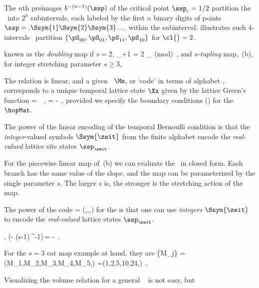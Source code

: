 \begin{description}
{The $n$th
preimages $b^{-(n-1)}(\ssp)$ of the critical point $\ssp_c=1/2$
partition the \statesp\ into $2^n$ subintervals, each labeled
by the first $n$ binary digits of points $\ssp=.\Ssym{1}
\Ssym{2} \Ssym{3} \ldots $ within the subinterval:
 illustrates such 4-intervals \statesp\
partition $\{\pS_{00},\pS_{01},\pS_{11},\pS_{10}\}$  for
$\cl{}=2$.

known as the {\em doubling} map if ${s}=2$,
\beq
\ssp_{\zeit+1} = 2 \ssp_{\zeit} \;\; (\mbox{mod})
\,,
and {\em ${s}$-tupling} map, \,(b), for
integer stretching parameter ${s}\geq3$,

The relation is linear, and a given \brick\ $\Mm$, or `code' in terms of
alphabet  \refeq{base-sAlph}, corresponds to a unique temporal lattice
state $\Xx$ given by the lattice Green's function
\beq
\Xx
= \gd\,\Mm
\,,\qquad
\gd = - 
\,,
provided we specify the boundary conditions ({\bcs}) for the {\shiftOp}
$\hopMat$.

The power of the linear encoding of the {temporal
Bernoulli} condition  is that the
\emph{integer}-valued symbols $\Ssym{\zeit}$ from the finite alphabet
\refeq{base-sAlph} encode the \emph{real-valued} lattice site states
$\ssp_{\zeit}$.

For the  %
piecewise linear map of \,(b)
we can evaluate the \dzeta\ in closed form.
Each branch has the same value of the
slope, and the map can be parameterized
by the single parameter ${s}$.
The larger ${s}$ is, the stronger is the stretching action of the map.

The power of the code %
\beq
\transp{\Mm} %
             = (\Ssym{\zeit},,\cdots,)
\ee{linCode}
for the {\templatt}  is that one can use \emph{integers}
$\Ssym{\zeit}$ to encode the \emph{real-valued} lattice states $\ssp_{\zeit}$.

,
\beq
(\partial - (s-1)\,\hopMat^{-1})\,\Xx = -\Mm
\,.

For
the $s=3$ cat map example at hand, they are
\beq
\{M_j\} = (M_1,M_2,M_3,M_4,M_5,\cdots)
=(1,2,5,10,24,\cdots)
\,,

Visualizing the volume relation  for a general \cl{}\dmn\
{\fundPip} is not easy, but

}
\end{description}
